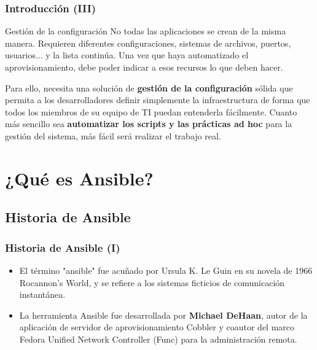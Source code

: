 \documentclass[
	11pt, %
]{beamer}
\begin{document}
\begin{frame}
	\frametitle{Introducción (III)}

        \begin{block}{Gestión de la configuración}
            No todas las aplicaciones se crean de la misma manera. Requieren diferentes configuraciones, sistemas de archivos, puertos, usuarios... y la lista continúa. Una vez que haya automatizado el aprovisionamiento, debe poder indicar a esos recursos lo que deben hacer.
        \end{block}
        \begin{block}{}
            Para ello, necesita una solución de \textbf{gestión de la configuración} sólida que permita a los desarrolladores definir simplemente la infraestructura de forma que todos los miembros de su equipo de TI puedan entenderla fácilmente. Cuanto más sencillo sea \textbf{automatizar los scripts y las prácticas ad hoc} para la gestión del sistema, más fácil será realizar el trabajo real. \cite{p1}
        \end{block}

\end{frame}


\section{¿Qué es Ansible?}

\subsection{Historia de Ansible}

\begin{frame}
	\frametitle{Historia de Ansible (I)}
	
	\begin{itemize}
		\item El término "ansible" fue acuñado por Ursula K. Le Guin en su novela de 1966 Rocannon's World, y se refiere a los sistemas ficticios de comunicación instantánea.

            \item La herramienta Ansible fue desarrollada por \textbf{Michael DeHaan}, autor de la aplicación de servidor de aprovisionamiento Cobbler y coautor del marco Fedora Unified Network Controller (Func) para la administración remota. \cite{p2}
		
	\end{itemize}
	
\end{frame}
\end{document}
